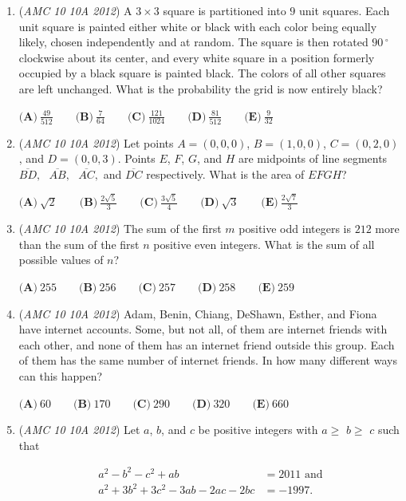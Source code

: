 \begin{enumerate}
	\item (\textit{AMC 10 10A 2012}) A $3 \times 3$ square is partitioned into $9$ unit squares. Each unit square is painted either white or black with each color being equally likely, chosen independently and at random. The square is then rotated $90\,^{\circ}$ clockwise about its center, and every white square in a position formerly occupied by a black square is painted black. The colors of all other squares are left unchanged. What is the probability the grid is now entirely black?


 $\textbf{(A)}\ \frac{49}{512}\qquad\textbf{(B)}\ \frac{7}{64}\qquad\textbf{(C)}\ \frac{121}{1024}\qquad\textbf{(D)}\ \frac{81}{512}\qquad\textbf{(E)}\ \frac{9}{32}$


	\item (\textit{AMC 10 10A 2012}) Let points $A = (0 ,0 ,0)$, $B = (1, 0, 0)$, $C = (0, 2, 0)$, and $D = (0, 0, 3)$. Points $E$, $F$, $G$, and $H$ are midpoints of line segments $\overline{BD},\text{ }  \overline{AB}, \text{ } \overline {AC},$ and $\overline{DC}$ respectively. What is the area of $EFGH$?


 $\textbf{(A)}\ \sqrt{2}\qquad\textbf{(B)}\ \frac{2\sqrt{5}}{3}\qquad\textbf{(C)}\ \frac{3\sqrt{5}}{4}\qquad\textbf{(D)}\ \sqrt{3}\qquad\textbf{(E)}\ \frac{2\sqrt{7}}{3}$


	\item (\textit{AMC 10 10A 2012}) The sum of the first $m$ positive odd integers is $212$ more than the sum of the first $n$ positive even integers. What is the sum of all possible values of $n$?


 $\textbf{(A)}\ 255\qquad\textbf{(B)}\ 256\qquad\textbf{(C)}\ 257\qquad\textbf{(D)}\ 258\qquad\textbf{(E)}\ 259$


	\item (\textit{AMC 10 10A 2012}) Adam, Benin, Chiang, DeShawn, Esther, and Fiona have internet accounts.  Some, but not all, of them are internet friends with each other, and none of them has an internet friend outside this group.  Each of them has the same number of internet friends.  In how many different ways can this happen?


 $\textbf{(A)}\ 60\qquad\textbf{(B)}\ 170\qquad\textbf{(C)}\ 290\qquad\textbf{(D)}\ 320\qquad\textbf{(E)}\ 660$


	\item (\textit{AMC 10 10A 2012}) Let $a$, $b$, and $c$ be positive integers with $a\ge$ $b\ge$ $c$ such that

 \begin{align*}a^2-b^2-c^2+ab&=2011\text{ and}\\ a^2+3b^2+3c^2-3ab-2ac-2bc&=-1997.\end{align*}




\end{enumerate}

